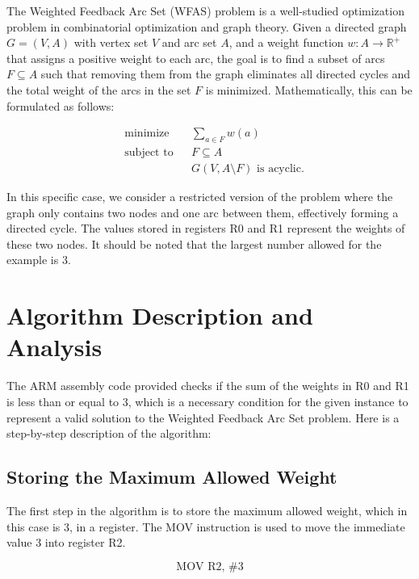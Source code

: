 The Weighted Feedback Arc Set (WFAS) problem is a well-studied optimization problem in combinatorial optimization and graph theory. Given a directed graph $G=(V, A)$ with vertex set $V$ and arc set $A$, and a weight function $w: A \rightarrow \mathbb{R^+}$ that assigns a positive weight to each arc, the goal is to find a subset of arcs $F \subseteq A$ such that removing them from the graph eliminates all directed cycles and the total weight of the arcs in the set $F$ is minimized. Mathematically, this can be formulated as follows:

\begin{equation}
\begin{aligned}
& \text{minimize}
& & \sum_{a \in F} w(a) \\
& \text{subject to}
& & F \subseteq A \\
& & & G(V, A \setminus F) \text{ is acyclic.}
\end{aligned}
\end{equation}

In this specific case, we consider a restricted version of the problem where the graph only contains two nodes and one arc between them, effectively forming a directed cycle. The values stored in registers R0 and R1 represent the weights of these two nodes. It should be noted that the largest number allowed for the example is 3.

\section{Algorithm Description and Analysis}

The ARM assembly code provided checks if the sum of the weights in R0 and R1 is less than or equal to 3, which is a necessary condition for the given instance to represent a valid solution to the Weighted Feedback Arc Set problem. Here is a step-by-step description of the algorithm:

\subsection{Storing the Maximum Allowed Weight}

The first step in the algorithm is to store the maximum allowed weight, which in this case is 3, in a register. The MOV instruction is used to move the immediate value 3 into register R2.

\begin{equation}
\text{MOV R2, \#3}
\end{equation}

